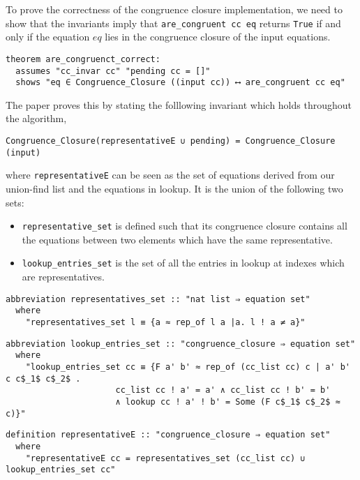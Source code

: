 To prove the correctness of the congruence closure implementation, we need to show that the invariants imply that \lstinline{are_congruent cc eq} returns \lstinline{True} if and only if the equation $eq$ lies in the congruence closure of the input equations.

\begin{lstlisting}
theorem are_congruenct_correct:
  assumes "cc_invar cc" "pending cc = []"
  shows "eq ∈ Congruence_Closure ((input cc)) ⟷ are_congruent cc eq"
\end{lstlisting}

The paper \cite{Nieuwenhuis} proves this by stating the folllowing invariant which holds throughout the algorithm,

\begin{lstlisting}
Congruence_Closure(representativeE ∪ pending) = Congruence_Closure (input)
\end{lstlisting}

where \lstinline{representativeE} can be seen as the set of equations derived from our union-find list and the equations in lookup. It is the union of the following two sets:

\begin{itemize}
    \item\lstinline{representative_set} is defined such that its congruence closure contains all the equations between two elements which have the same representative.
    \item\lstinline{lookup_entries_set} is the set of all the entries in lookup at indexes which are representatives.
\end{itemize}

\begin{lstlisting}
abbreviation representatives_set :: "nat list ⇒ equation set"
  where
    "representatives_set l ≡ {a ≈ rep_of l a |a. l ! a ≠ a}"
\end{lstlisting}

\begin{lstlisting}
abbreviation lookup_entries_set :: "congruence_closure ⇒ equation set"
  where
    "lookup_entries_set cc ≡ {F a' b' ≈ rep_of (cc_list cc) c | a' b' c c$_1$ c$_2$ .
                      cc_list cc ! a' = a' ∧ cc_list cc ! b' = b'
                      ∧ lookup cc ! a' ! b' = Some (F c$_1$ c$_2$ ≈ c)}"
\end{lstlisting}

\begin{lstlisting}
definition representativeE :: "congruence_closure ⇒ equation set"
  where
    "representativeE cc = representatives_set (cc_list cc) ∪ lookup_entries_set cc"
\end{lstlisting}

